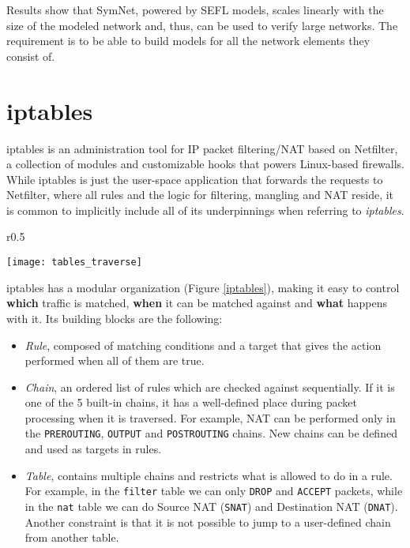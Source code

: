 \documentclass[twoside, 11pt, a4paper]{article}
\begin{document}
Results show that SymNet, powered by SEFL models, scales linearly with the size
of the modeled network \cite{stoenescu2016symnet} and, thus, can be used to
verify large networks.  The requirement is to be able to build models for all
the network elements they consist of.

\section{iptables}
iptables is an administration tool for IP packet filtering/NAT based on
Netfilter, a collection of modules and customizable hooks that powers
Linux-based firewalls. While iptables is just the user-space application that
forwards the requests to Netfilter, where all rules and the logic for
filtering, mangling and NAT reside, it is common to implicitly include all of
its underpinnings when referring to \emph{iptables}.

\begin{wrapfigure}{r}{0.5\textwidth}
  \vspace{-20pt}
  \begin{center}
    \texttt{[image: tables\_traverse]}
  \end{center}
  \vspace{-20pt}
  \caption{iptables forwarding path}
  \vspace{-10pt}
  \label{iptables}
\end{wrapfigure}

iptables has a modular organization (Figure \ref{iptables}), making it easy to
control \textbf{which} traffic is matched, \textbf{when} it can be matched
against and \textbf{what} happens with it. Its building blocks are the
following:

\begin{itemize}
  \item \emph{Rule}, composed of matching conditions and a target that gives
    the action performed when all of them are true.

  \item \emph{Chain}, an ordered list of rules which are checked against
    sequentially.  If it is one of the 5 built-in chains, it has a well-defined
    place during packet processing when it is traversed.  For example, NAT can
    be performed only in the \texttt{PREROUTING}, \texttt{OUTPUT} and
    \texttt{POSTROUTING} chains. New chains can be defined and used as targets
    in rules.

  \item \emph{Table}, contains multiple chains and restricts what is allowed to
    do in a rule. For example, in the \texttt{filter} table we can only
    \texttt{DROP} and \texttt{ACCEPT} packets, while in the \texttt{nat} table
    we can do Source NAT (\texttt{SNAT}) and Destination NAT (\texttt{DNAT}).
    Another constraint is that it is not possible to jump to a user-defined
    chain from another table.
\end{itemize}
\end{document}
